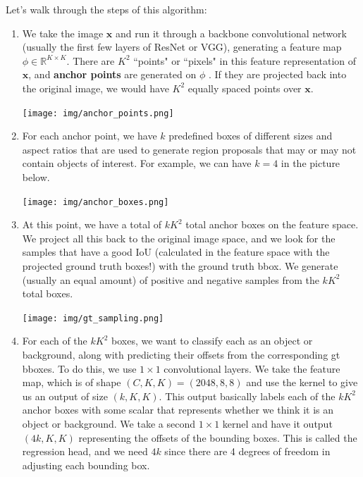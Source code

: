 \documentclass{article}
\theoremstyle{definition}
\theoremstyle{remark}
\theoremstyle{definition}
\begin{document}
    Let's walk through the steps of this algorithm: 
    \begin{enumerate}
        \item We take the image $\mathbf{x}$ and run it through a backbone convolutional network (usually the first few layers of ResNet or VGG), generating a feature map $\phi \in \mathbb{R}^{K \times K}$. There are $K^2$ ``points" or ``pixels" in this feature representation of $\mathbf{x}$, and \textbf{anchor points} are generated on $\phi$ . If they are projected back into the original image, we would have $K^2$ equally spaced points over $\mathbf{x}$. 
            \begin{center}
                \texttt{[image: img/anchor\_points.png]}
            \end{center}
        \item For each anchor point, we have $k$ predefined boxes of different sizes and aspect ratios that are used to generate region proposals that may or may not contain objects of interest. For example, we can have $k = 4$ in the picture below. 
        \begin{center}
            \texttt{[image: img/anchor\_boxes.png]}
        \end{center}
        \item At this point, we have a total of $k K^2$ total anchor boxes on the feature space. We project all this back to the original image space, and we look for the samples that have a good IoU (calculated in the feature space with the projected ground truth boxes!) with the ground truth bbox. We generate (usually an equal amount) of positive and negative samples from the $k K^2$ total boxes. 
        \begin{center}
            \texttt{[image: img/gt\_sampling.png]}
        \end{center}
        
        \item For each of the $k K^2$ boxes, we want to classify each as an object or background, along with predicting their offsets from the corresponding gt bboxes. To do this, we use $1 \times 1$ convolutional layers. We take the feature map, which is of shape $(C, K, K) = (2048, 8, 8)$ and use the kernel to give us an output of size $(k, K, K)$. This output basically labels each of the $k K^2$ anchor boxes with some scalar that represents whether we think it is an object or background. We take a second $1 \times 1$ kernel and have it output $(4k, K, K)$ representing the offsets of the bounding boxes. This is called the regression head, and we need $4k$ since there are 4 degrees of freedom in adjusting each bounding box. 
        

\end{enumerate}
\end{document}

